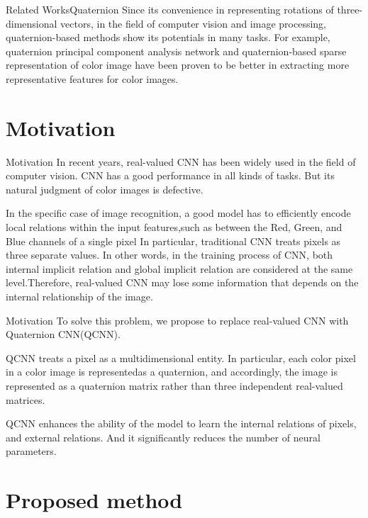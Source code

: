 \documentclass{beamer}
\begin{document}
\begin{frame}{Related Works}{Quaternion}
Since its convenience in representing rotations of three-dimensional vectors, in the field of computer vision and image processing, quaternion-based methods show its potentials in many tasks. For example, quaternion principal component analysis network\cite{ZENG2016416} and quaternion-based sparse representation of color image\cite{6607436} have been proven to be better in extracting more representative features for color images.
\end{frame}





\section{Motivation}
\begin{frame}{Motivation}
In recent years, real-valued CNN has been widely used in the field of computer vision. CNN has a good performance in all kinds of tasks. But its natural judgment of color images is defective.

In the specific case of image recognition, a good model has to efficiently encode local relations within the input features,such as between the Red, Green, and Blue channels of a single pixel
In particular, traditional CNN treats pixels as three separate values.
In other words, in the training process of CNN, both internal implicit relation and global implicit relation are considered at the same level.Therefore, real-valued CNN may lose some information that depends on the internal relationship of the image.
\end{frame}
\begin{frame}{Motivation}
To solve this problem, we propose to replace real-valued CNN with Quaternion CNN(QCNN).

QCNN treats a pixel as a multidimensional entity.
In particular, each color pixel in a color image is representedas a quaternion, and accordingly, the image is represented as a quaternion matrix rather than three independent real-valued matrices.

QCNN enhances the ability of the model to learn the internal relations of pixels, and external relations. And it significantly reduces the number of neural parameters.
\end{frame}

\section{Proposed method}
\end{document}
